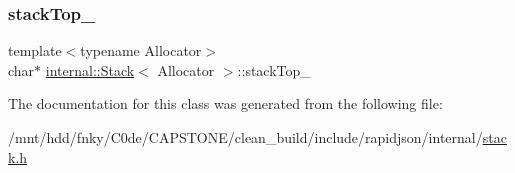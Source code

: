\subsubsection{\texorpdfstring{stack\+Top\+\_\+}{stackTop\_}}
{\footnotesize\ttfamily template$<$typename Allocator$>$ \\
char$\ast$ \hyperlink{classinternal_1_1Stack}{internal\+::\+Stack}$<$ Allocator $>$\+::stack\+Top\+\_\+\hspace{0.3cm}{\ttfamily [private]}}



The documentation for this class was generated from the following file\+:\begin{DoxyCompactItemize}
\item 
/mnt/hdd/fnky/\+C0de/\+C\+A\+P\+S\+T\+O\+N\+E/clean\+\_\+build/include/rapidjson/internal/\hyperlink{stack_8h}{stack.\+h}\end{DoxyCompactItemize}
